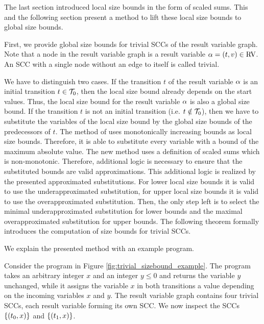 The last section introduced local size bounds in the form of scaled sums.
This and the following section present a method to lift these local size bounds to global size bounds.

First, we provide global size bounds for trivial SCCs of the result variable graph.
Note that a node in the result variable graph is a result variable $\alpha = (t,v) \in \text{RV}$.
An SCC with a single node without an edge to itself is called trivial.

We have to distinguish two cases.
If the transition $t$ of the result variable $\alpha$ is an initial transition $t \in \mathcal{T}_0$, then the local size bound already depends on the start values.
Thus, the local size bound for the result variable $\alpha$ is also a global size bound.
If the transition $t$ is not an initial transition (i.e. $t \notin \mathcal{T}_0$), then we have to substitute the variables of the local size bound by the global size bounds of the predecessors of $t$.
The method of \cite{koat} uses monotonically increasing bounds as local size bounds.
Therefore, it is able to substitute every variable with a bound of the maximum absolute value.
The new method uses a definition of scaled sums which is non-monotonic.
Therefore, additional logic is necessary to ensure that the substituted bounds are valid approximations.
This additional logic is realized by the presented approximated substitutions.
For lower local size bounds it is valid to use the underapproximated substitution, for upper local size bounds it is valid to use the overapproximated substitution.
Then, the only step left is to select the minimal underapproximated substitution for lower bounds and the maximal overapproximated substitution for upper bounds.
The following theorem formally introduces the computation of size bounds for trivial SCCs.



We explain the presented method with an example program.



Consider the program in Figure \ref{fig:trivial_sizebound_example}.
The program takes an arbitrary integer $x$ and an integer $y \leq 0$ and returns the variable $y$ unchanged, while it assigns the variable $x$ in both transitions a value depending on the incoming variables $x$ and $y$.
The result variable graph contains four trivial SCCs, each result variable forming its own SCC.
We now inspect the SCCs $\lbrace (t_0,x) \rbrace$ and $\lbrace (t_1,x) \rbrace$.
  
